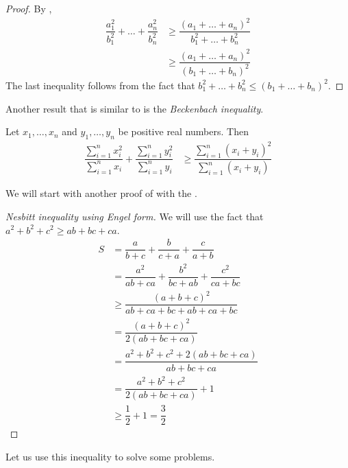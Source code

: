 \documentclass{subfile}
\begin{document}
		\begin{proof}
			By ,
				\begin{align*}
					\dfrac{a_1^2}{b_1^2}+\ldots+\dfrac{a_n^2}{b_n^2}
						& \geq\dfrac{(a_1+\ldots+a_n)^2}{b_1^2+\ldots+b_n^2}\\
						& \geq\dfrac{(a_1+\ldots+a_n)^2}{(b_1+\ldots+b_n)^2}
				\end{align*}
			The last inequality follows from the fact that $b_1^2+\ldots+b_n^2\leq(b_1+\ldots+b_n)^2$.
		\end{proof}
	Another result that is similar to  is the \textit{Beckenbach inequality}.
		\begin{theorem}
			Let $x_{1},\ldots,x_{n}$ and $y_{1},\ldots,y_{n}$ be positive real numbers. Then
				\begin{align*}
					\dfrac{\sum_{i=1}^{n}x_{i}^{2}}{\sum_{i=1}^{n}x_{i}}+\dfrac{\sum_{i=1}^{n}y_{i}^{2}}{\sum_{i=1}^{n}y_{i}}
						& \geq \dfrac{\sum_{i=1}^{n}(x_{i}+y_{i})^{2}}{\sum_{i=1}^{n}(x_{i}+y_{i})}
				\end{align*}
		\end{theorem}
	We will start with another proof of  with the .
		\begin{proof}[Nesbitt inequality using Engel form]
			We will use the fact that $a^2+b^2+c^2\geq ab+bc+ca$.
				\begin{align*}
					S
						& = \dfrac{a}{b+c}+\dfrac{b}{c+a}+\dfrac{c}{a+b}\\
						& = \dfrac{a^2}{ab+ca}+\dfrac{b^2}{bc+ab}+\dfrac{c^2}{ca+bc}\\
						& \geq\dfrac{(a+b+c)^2}{ab+ca+bc+ab+ca+bc}\\
						& = \dfrac{(a+b+c)^2}{2(ab+bc+ca)}\\
						& = \dfrac{a^2+b^2+c^2+2(ab+bc+ca)}{ab+bc+ca}\\
						& = \dfrac{a^2+b^2+c^2}{2(ab+bc+ca)}+1\\
						& \geq\dfrac{1}{2}+1=\dfrac{3}{2}
				\end{align*}
		\end{proof}
	Let us use this inequality to solve some problems.
\end{document}
